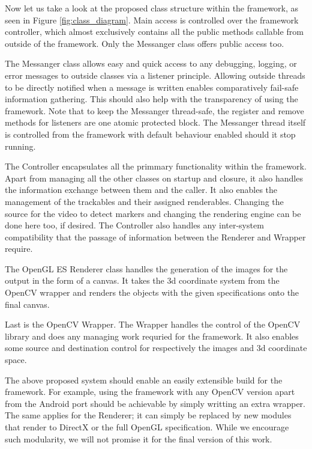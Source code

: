 Now let us take a look at the proposed class structure within the framework, as seen in Figure \ref{fig:class_diagram}.
Main access is controlled over the framework controller, which almost exclusively contains all the public methods callable from outside of the framework.
Only the Messanger class offers public access too.

The Messanger class allows easy and quick access to any debugging, logging, or error messages to outside classes via a listener principle.
Allowing outside threads to be directly notified when a message is written enables comparatively fail-safe information gathering.
This should also help with the transparency of using the framework.
Note that to keep the Messanger thread-safe, the register and remove methods for listeners are one atomic protected block.
The Messanger thread itself is controlled from the framework with default behaviour enabled should it stop running.

The Controller encapsulates all the primmary functionality within the framework.
Apart from managing all the other classes on startup and closure, it also handles the information exchange between them and the caller.
It also enables the management of the trackables and their assigned renderables.
Changing the source for the video to detect markers and changing the rendering engine can be done here too, if desired.
The Controller also handles any inter-system compatibility that the passage of information between the Renderer and Wrapper require.

The OpenGL ES Renderer class handles the generation of the images for the output in the form of a canvas.
It takes the 3d coordinate system from the OpenCV wrapper and renders the objects with the given specifications onto the final canvas.

Last is the OpenCV Wrapper. The Wrapper handles the control of the OpenCV library and does any managing work requried for the framework.
It also enables some source and destination control for respectively the images and 3d coordinate space.

The above proposed system should enable an easily extensible build for the framework.
For example, using the framework with any OpenCV version apart from the Android port should be achievable by simply writting an extra wrapper.
The same applies for the Renderer; it can simply be replaced by new modules that render to DirectX or the full OpenGL specification.
While we encourage such modularity, we will not promise it for the final version of this work.

